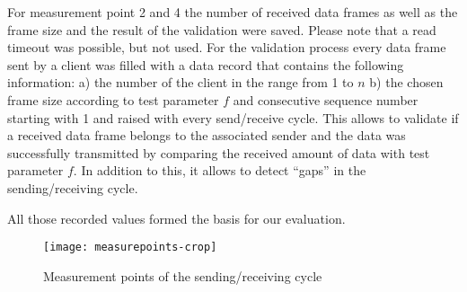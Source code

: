 \documentclass{sig-alternate}
\begin{document}
For measurement point 2 and 4 the number of received data frames as well as the 
frame size and the result of the validation were saved. Please note that a read 
timeout was possible, but not used. For the validation process every data frame 
sent by a client was filled with a data record that contains the following 
information: a) the number of the client in the range from 1 to $n$ b) the 
chosen frame size according to test parameter $f$ and consecutive sequence 
number starting with 1 and raised with every send/receive cycle. This allows to 
validate if a received data frame belongs to the associated sender and the data 
was successfully transmitted by comparing the received amount of data with test 
parameter $f$. In addition to this, it allows to detect ``gaps'' in the 
sending/receiving cycle.

All those recorded values formed the basis for our evaluation.
\begin{figure}[!t]
\centering
\texttt{[image: measurepoints-crop]}
\caption{Measurement points of the sending/receiving cycle}
\label{fig:measurepoints}
\end{figure}
\end{document}

